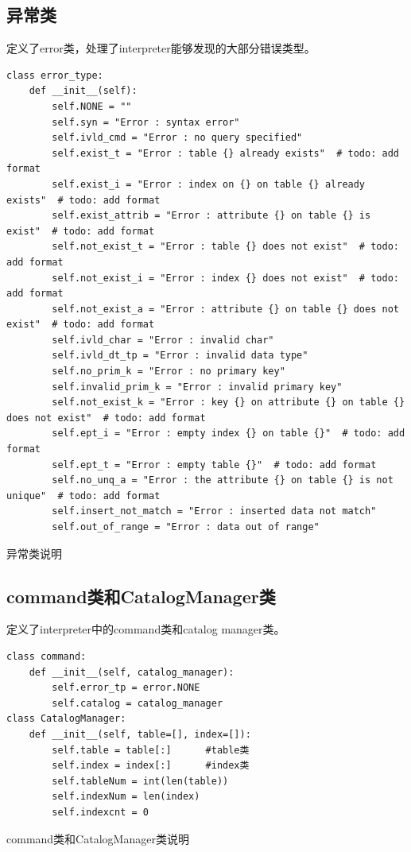 \documentclass[UTF8]{ctexrep} %
\newenvironment{longlisting}{\captionsetup{type=listing}}{}
\begin{document}
\subsection{异常类}
定义了error类，处理了interpreter能够发现的大部分错误类型。
\begin{longlisting}
    \begin{verbatim}
class error_type:
    def __init__(self):
        self.NONE = ""
        self.syn = "Error : syntax error"
        self.ivld_cmd = "Error : no query specified"
        self.exist_t = "Error : table {} already exists"  # todo: add format
        self.exist_i = "Error : index on {} on table {} already exists"  # todo: add format
        self.exist_attrib = "Error : attribute {} on table {} is exist"  # todo: add format
        self.not_exist_t = "Error : table {} does not exist"  # todo: add format
        self.not_exist_i = "Error : index {} does not exist"  # todo: add format
        self.not_exist_a = "Error : attribute {} on table {} does not exist"  # todo: add format
        self.ivld_char = "Error : invalid char"
        self.ivld_dt_tp = "Error : invalid data type"
        self.no_prim_k = "Error : no primary key"
        self.invalid_prim_k = "Error : invalid primary key"
        self.not_exist_k = "Error : key {} on attribute {} on table {} does not exist"  # todo: add format
        self.ept_i = "Error : empty index {} on table {}"  # todo: add format
        self.ept_t = "Error : empty table {}"  # todo: add format
        self.no_unq_a = "Error : the attribute {} on table {} is not unique"  # todo: add format
        self.insert_not_match = "Error : inserted data not match"
        self.out_of_range = "Error : data out of range"
    \end{verbatim}
    \caption{异常类说明}
    \label{lst:interface_specification}
\end{longlisting}

\subsection{command类和CatalogManager类}
定义了interpreter中的command类和catalog manager类。
\begin{longlisting}
    \begin{verbatim}
class command:
    def __init__(self, catalog_manager):
        self.error_tp = error.NONE
        self.catalog = catalog_manager
class CatalogManager:
    def __init__(self, table=[], index=[]):
        self.table = table[:]      #table类
        self.index = index[:]      #index类
        self.tableNum = int(len(table))
        self.indexNum = len(index)
        self.indexcnt = 0
    \end{verbatim}
    \caption{command类和CatalogManager类说明}
    \label{lst:interface_specification}
\end{longlisting}
\end{document}
